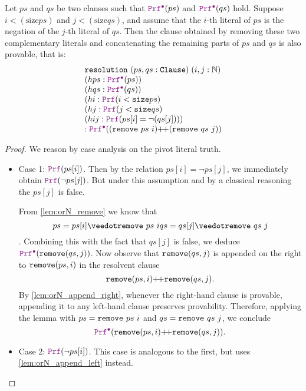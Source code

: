 \begin{theorem}[Resolution]
Let $ps$ and $qs$ be two clauses such that $\prfcl(ps)$ and $\prfcl(qs)$ hold.
Suppose $i < (\mathrm{size} ps)$ and $j < (\mathrm{size} qs)$, and assume that the $i$-th literal of $ps$ is the negation of the $j$-th literal of $qs$.
Then the clause obtained by removing these two complementary literals and  concatenating the remaining parts of $ps$ and $qs$ is also provable, that is:
\[
\begin{array}{l}
  \tt{resolution}~(ps, qs : \tt{Clause})\; (i, j : \mathbb{N}) \\
  (hps : \prfcl(ps)) \\
  (hqs : \prfcl(qs)) \\
  (hi  : \prf(i < \tt{size} ps) \\
  (hj  : \prf(j < \tt{size} qs) \\
  (hij : \prf(ps[i] = \lnot(qs[j]))) \\
  : \prfcl((\tt{remove}~ps~i) \pp (\tt{remove}~qs~j))
\end{array}
\]
\begin{proof}
We reason by case analysis on the pivot literal truth.

\begin{itemize}
\item[] Case 1: \(\prf(ps[i])\).
  Then by the relation $ps[i] = \lnot ps[j]$, we immediately obtain $\prf(\lnot ps[j])$.
  But under this assumption and by a classical reasoning the $ps[j]$ is false.

  From \cref{lem:orN_remove} we know that
  \[
      ps = ps[i] \veedot \kw{remove}~ps~i\\
      qs = qs[j] \veedot \kw{remove}~qs~j
  \].
  Combining this with the fact that $qs[j]$ is false, we deduce $\prfcl(\kw{remove}(qs,j))$.
  Now observe that $\texttt{\upshape{remove}}(qs,j)$ is appended on the right to $\texttt{\upshape{remove}}(ps,i)$
  in the resolvent clause
  \[
    \texttt{\upshape{remove}}(ps,i)  {+}\!{+}  \texttt{\upshape{remove}}(qs,j).
  \]
  By \cref{lem:orN_append_right}, whenever the right-hand clause is provable,
  appending it to any left-hand clause preserves provability.
  Therefore, applying the lemma with $ps =\texttt{\upshape{remove}}~ps~i$ and $qs =\texttt{\upshape{remove}}~qs~j$,
  we conclude
  \[
    \prfcl(\kw{remove}(ps,i) \pp \kw{remove}(qs,j)).
  \]
\item[] Case 2: \(\prf(\lnot ps[i])\). This case is analogous to the first, but uses \cref{lem:orN_append_left} instead.
\end{itemize}
\end{proof}
\end{theorem}


